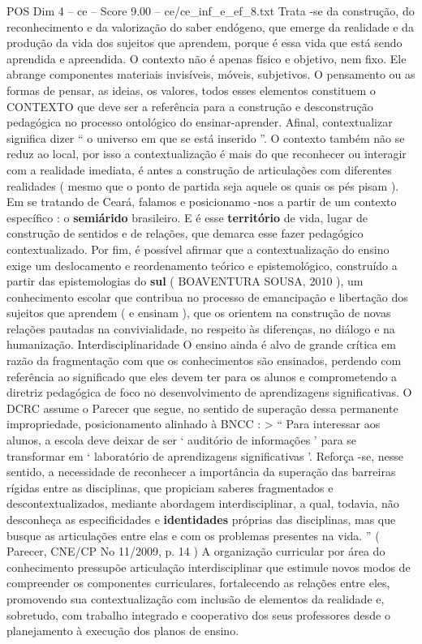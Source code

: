 \begin{textsample}{POS Dim 4 – ce – Score 9.00 – ce/ce\_inf\_e\_ef\_8.txt}
Trata -se da construção, do reconhecimento e da valorização do saber endógeno, que emerge da realidade e da produção da vida dos sujeitos que aprendem, porque é essa vida que está sendo aprendida e apreendida.
O contexto não é apenas físico e objetivo, nem fixo.
Ele abrange componentes materiais invisíveis, móveis, subjetivos.
O pensamento ou as formas de pensar, as ideias, os valores, todos esses elementos constituem o CONTEXTO que deve ser a referência para a construção e desconstrução pedagógica no processo ontológico do ensinar-aprender.
Afinal, contextualizar significa dizer “ o universo em que se está inserido ”.
O contexto também não se reduz ao local, por isso a contextualização é mais do que reconhecer ou interagir com a realidade imediata, é antes a construção de articulações com diferentes realidades ( mesmo que o ponto de partida seja aquele os quais os pés pisam ).
Em se tratando de Ceará, falamos e posicionamo -nos a partir de um contexto específico : o \textbf{semiárido} brasileiro.
E é esse \textbf{território} de vida, lugar de construção de sentidos e de relações, que demarca esse fazer pedagógico contextualizado.
Por fim, é possível afirmar que a contextualização do ensino exige um deslocamento e reordenamento teórico e epistemológico, construído a partir das epistemologias do \textbf{sul} ( BOAVENTURA SOUSA, 2010 ), um conhecimento escolar que contribua no processo de emancipação e libertação dos sujeitos que aprendem ( e ensinam ), que os orientem na construção de novas relações pautadas na convivialidade, no respeito às diferenças, no diálogo e na humanização.
Interdisciplinaridade O ensino ainda é alvo de grande crítica em razão da fragmentação com que os conhecimentos são ensinados, perdendo com referência ao significado que eles devem ter para os alunos e comprometendo a diretriz pedagógica de foco no desenvolvimento de aprendizagens significativas.
O DCRC assume o Parecer que segue, no sentido de superação dessa permanente impropriedade, posicionamento alinhado à BNCC : > “ Para interessar aos alunos, a escola deve deixar de ser ‘ auditório de informações ’ para se transformar em ‘ laboratório de aprendizagens significativas ’.
Reforça -se, nesse sentido, a necessidade de reconhecer a importância da superação das barreiras rígidas entre as disciplinas, que propiciam saberes fragmentados e descontextualizados, mediante abordagem interdisciplinar, a qual, todavia, não desconheça as especificidades e \textbf{identidades} próprias das disciplinas, mas que busque as articulações entre elas e com os problemas presentes na vida. ” ( Parecer, CNE/CP No 11/2009, p. 14 ) A organização curricular por área do conhecimento pressupõe articulação interdisciplinar que estimule novos modos de compreender os componentes curriculares, fortalecendo as relações entre eles, promovendo sua contextualização com inclusão de elementos da realidade e, sobretudo, com trabalho integrado e cooperativo dos seus professores desde o planejamento à execução dos planos de ensino.

\end{textsample}
